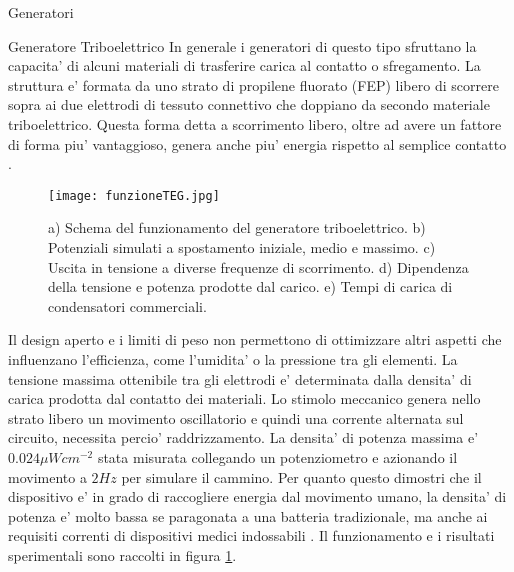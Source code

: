 \begin{section}{Generatori}
    \begin{subsection}{Generatore Triboelettrico}
        In generale i generatori di questo tipo sfruttano la capacita' di alcuni materiali di trasferire carica al contatto o sfregamento. La struttura e' formata da uno strato di propilene fluorato (FEP) libero di scorrere sopra ai due elettrodi di tessuto connettivo che doppiano da secondo materiale triboelettrico. Questa forma detta a scorrimento libero, oltre ad avere un fattore di forma piu' vantaggioso, genera anche piu' energia rispetto al semplice contatto \cite{fuAchievingUltraDurabilityHigh2024}. 
        \begin{figure}[H]
            \texttt{[image: funzioneTEG.jpg]}
            \centering
            \caption{a) Schema del funzionamento del generatore triboelettrico. b) Potenziali simulati a spostamento iniziale, medio e massimo. c) Uscita in tensione a diverse frequenze di scorrimento. d) Dipendenza della tensione e potenza prodotte dal carico. e) Tempi di carica di condensatori commerciali.\cite{kouWearableAllFabricHybrid2024}}
            \label{fig:funzioneTEG}
        \end{figure}
        Il design aperto e i limiti di peso non permettono di ottimizzare altri aspetti che influenzano l'efficienza, come l'umidita' o la pressione tra gli elementi. La tensione massima ottenibile tra gli elettrodi e' determinata dalla densita' di carica prodotta dal contatto dei materiali. Lo stimolo meccanico genera nello strato libero un movimento oscillatorio e quindi una corrente alternata sul circuito, necessita percio' raddrizzamento. La densita' di potenza massima e' \(0.024\mu Wcm^{-2}\) stata misurata collegando un potenziometro e azionando il movimento a \(2Hz\) per simulare il cammino. Per quanto questo dimostri che il dispositivo e' in grado di raccogliere energia dal movimento umano, la densita' di potenza e' molto bassa se paragonata a una batteria tradizionale, ma anche ai requisiti correnti di dispositivi medici indossabili \cite{gaoAdvancedEnergyHarvesters2024}. Il funzionamento e i risultati sperimentali sono raccolti in figura \ref{fig:funzioneTEG}.
        
    \end{subsection}
    

\end{section}
